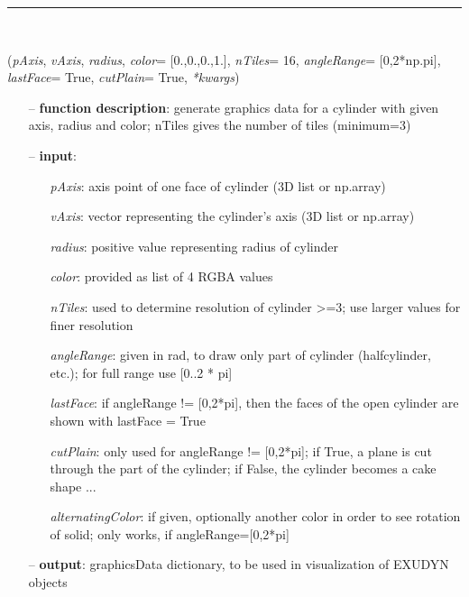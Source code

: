 \begin{itemize}[leftmargin=1.4cm]
\begin{itemize}[leftmargin=0.5cm]
\begin{itemize}[leftmargin=1.4cm]
\begin{itemize}[leftmargin=0.5cm]
\begin{itemize}[leftmargin=1.4cm]
\begin{itemize}[leftmargin=0.5cm]
%
\noindent\rule{8cm}{0.75pt}\vspace{1pt} \\ 
\begin{flushleft}
\label{sec:graphicsDataUtilities:GraphicsDataCylinder}
({\it pAxis}, {\it vAxis}, {\it radius}, {\it color}= [0.,0.,0.,1.], {\it nTiles}= 16, {\it angleRange}= [0,2*np.pi], {\it lastFace}= True, {\it cutPlain}= True, {\it **kwargs})
\end{flushleft}
\setlength{\itemindent}{0.7cm}
\begin{itemize}[leftmargin=0.7cm]
  \item[--]  {\bf function description}: generate graphics data for a cylinder with given axis, radius and color; nTiles gives the number of tiles (minimum=3)  \item[--]  {\bf input}: \vspace{-6pt}
  \begin{itemize}[leftmargin=1.2cm]
\setlength{\itemindent}{-0.7cm}
    \item[] {\it pAxis}: axis point of one face of cylinder (3D list or np.array)
    \item[] {\it   vAxis}: vector representing the cylinder's axis (3D list or np.array)
    \item[] {\it   radius}: positive value representing radius of cylinder
    \item[] {\it   color}: provided as list of 4 RGBA values
    \item[] {\it   nTiles}: used to determine resolution of cylinder >=3; use larger values for finer resolution
    \item[] {\it   angleRange}: given in rad, to draw only part of cylinder (halfcylinder, etc.); for full range use [0..2 * pi]
    \item[] {\it   lastFace}: if angleRange != [0,2*pi], then the faces of the open cylinder are shown with lastFace = True
    \item[] {\it   cutPlain}: only used for angleRange != [0,2*pi]; if True, a plane is cut through the part of the cylinder; if False, the cylinder becomes a cake shape ...
    \item[] {\it   alternatingColor}: if given, optionally another color in order to see rotation of solid; only works, if angleRange=[0,2*pi]
  \end{itemize}
  \item[--]  {\bf output}: graphicsData dictionary, to be used in visualization of EXUDYN objects\vspace{12pt}\end{itemize}

\end{itemize}
\end{itemize}
\end{itemize}
\end{itemize}
\end{itemize}
\end{itemize}
